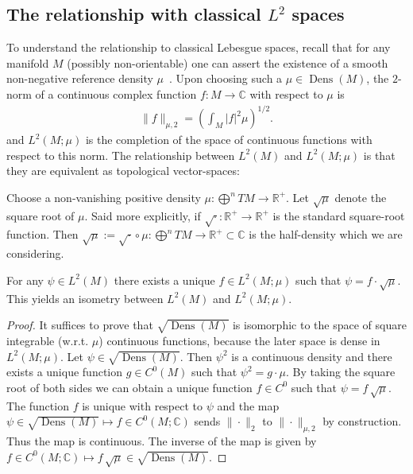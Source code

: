 \documentclass[final,leqno]{siamart}
\DeclareMathOperator{\Dens}{Dens}
\begin{document}
\subsection{The relationship with classical $L^{2}$ spaces}
\label{sec:classical_Lebesgue}
To understand the relationship to classical Lebesgue spaces, recall that for any manifold $M$ (possibly non-orientable) one can assert the existence of a smooth non-negative reference density $\mu$~\cite[Chapter 16]{Lee2006}.
Upon choosing such a $\mu \in \Dens(M)$, the $2$-norm of a continuous complex function $f:M \to \mathbb{C}$ with respect to $\mu$ is
\begin{align}
	\| f \|_{\mu,2} =  \left( \int_M |f|^2 \mu \right)^{1/2}.
\end{align}
and $L^2(M ; \mu)$ is the completion of the space of continuous functions with respect to this norm.
The relationship between $L^{2}(M)$ and $L^{2}(M;\mu)$ is that they are equivalent as topological vector-spaces:
\begin{proposition} \label{prop:non canonical}
	Choose a non-vanishing positive density $\mu : \bigoplus^{n}TM \to \mathbb{R}^{+}$.
	Let $\sqrt{\mu}$ denote the square root of $\mu$.
	Said more explicitly, if $\sqrt{\cdot}: \mathbb{R}^{+} \to \mathbb{R}^{+}$ is the standard square-root function.
	Then $\sqrt{\mu} := \sqrt{\cdot} \circ \mu : \bigoplus^{n} TM \to \mathbb{R}^{+} \subset \mathbb{C}$ is the half-density which we are considering.
	
	For any $\psi \in L^2(M)$ there exists a unique $f \in L^2(M ; \mu)$ such that $\psi = f \cdot  \sqrt{\mu}$.
	This yields an isometry between $L^2(M)$ and $L^2(M ; \mu)$.
\end{proposition}
\begin{proof}
	It suffices to prove that $\sqrt{\Dens(M)}$ is isomorphic to the space of square integrable (w.r.t. $\mu$) continuous functions, because
	the later space is dense in $L^{2}(M;\mu)$.
	Let $\psi \in \sqrt{\Dens(M)}$.  Then $\psi^2$ is a continuous density and there exists a unique function $g \in C^{0}(M)$ such that $\psi^{2} = g \cdot \mu$.
	By taking the square root of both sides we can obtain a unique function $f \in C^{0}$ such that $\psi = f\, \sqrt{\mu}$.
	The function $f$ is unique with respect to $\psi$ and
	the map $\psi \in \sqrt{\Dens(M)} \mapsto f \in C^0(M ; \mathbb{C} )$ sends $\| \cdot \|_{2}$ to $\| \cdot \|_{\mu,2}$ by construction.
	Thus the map is continuous.
	The inverse of the map is given by $f \in C^{0}(M;\mathbb{C}) \mapsto f \, \sqrt{\mu} \in \sqrt{\Dens(M)}$.
\end{proof}
\end{document}
